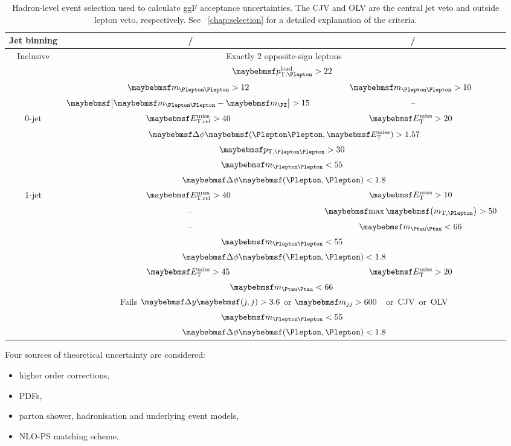 \begin{table}
	\begin{tabular}{ccc}
		\toprule
		Jet binning & \eech/\mmch & \emch/\mech \\
		\midrule
		Inclusive & \multicolumn{2}{c}{Exactly 2 opposite-sign leptons} \\
		& \multicolumn{2}{c}{\unit{$\ptleadlep > 22$}{\GeV}} \\
		& \unit{$\mll > 12$}{\GeV} & \unit{$\mll > 10$}{\GeV} \\
		& \unit{$\mods{\mll - \mZ} > 15$}{\GeV} & -- \\
		\midrule
		0-jet & \unit{$\metrel > 40$}{\GeV} & \unit{$\met > 20$}{\GeV} \\
		& \multicolumn{2}{c}{$\dphillmet > 1.57$} \\
		& \multicolumn{2}{c}{\unit{$\ptll > 30$}{\GeV}} \\
		& \multicolumn{2}{c}{\unit{$\mll < 55$}{\GeV}} \\
		& \multicolumn{2}{c}{$\dphill < 1.8$} \\
		\midrule
		1-jet & \unit{$\metrel > 40$}{\GeV} & \unit{$\met > 10$}{\GeV} \\
		& -- & \unit{$\maxmtw > 50$}{\GeV} \\
		& -- & \unit{$\mtautau < 66$}{\GeV} \\
		& \multicolumn{2}{c}{\unit{$\mll < 55$}{\GeV}} \\
		& \multicolumn{2}{c}{$\dphill < 1.8$} \\
		\midrule
		\twojet & \unit{$\met > 45$}{\GeV} & \unit{$\met > 20$}{\GeV} \\
		& \multicolumn{2}{c}{\unit{$\mtautau < 66$}{\GeV}} \\
		& \multicolumn{2}{c}{Fails $\dyjj > 3.6$ or \unit{$\mjj > 600$}{\GeV} or CJV or OLV} \\
		& \multicolumn{2}{c}{\unit{$\mll < 55$}{\GeV}} \\
		& \multicolumn{2}{c}{$\dphill < 1.8$} \\
		\bottomrule
	\end{tabular}
	\caption{Hadron-level event selection used to calculate ggF acceptance uncertainties. 
	The CJV and OLV are the central jet veto and outside lepton veto, respectively. See 
	\Chapter~\ref{chap:selection} for a detailed explanation of the criteria.}
	\label{tab:signal:acc_truthselection}
\end{table}

Four sources of theoretical uncertainty are considered:
\begin{itemize}[noitemsep,nolistsep]
	\item higher order corrections,
	\item \acp{PDF},
	\item parton shower, hadronisation and underlying event models,
	\item NLO-PS matching scheme.
\end{itemize}

